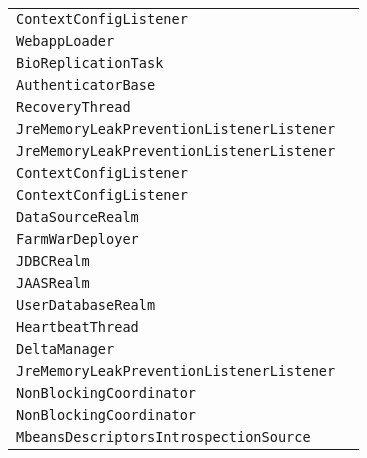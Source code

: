 \begin{center}
\begin{tabular}{ll}
\lstinline/ContextConfigListener/&\raisebox{0pt}{\lstinline/ processAnnotationsFile(File)/}\\ 
\lstinline/WebappLoader/&\raisebox{0pt}{\lstinline/ booleanbuildClassPath(StringBuilder)/}\\ 
\lstinline/BioReplicationTask/&\raisebox{0pt}{\lstinline/ sendAck(byte[])/}\\ 
\lstinline/AuthenticatorBase/&\raisebox{0pt}{\lstinline/ JaspicStategetJaspicState(AuthConfigProvider)/}\\ 
\lstinline/RecoveryThread/&\raisebox{0pt}{\lstinline/ run()/}\\ 
\lstinline/JreMemoryLeakPreventionListenerListener/&\raisebox{0pt}{\lstinline/ lifecycleEvent(LifecycleEvent)/}\\ 
\lstinline/JreMemoryLeakPreventionListenerListener/&\raisebox{0pt}{\lstinline/ lifecycleEvent(LifecycleEvent)/}\\ 
\lstinline/ContextConfigListener/&\raisebox{0pt}{\lstinline/ processAnnotationsFile(File)/}\\ 
\lstinline/ContextConfigListener/&\raisebox{0pt}{\lstinline/ processAnnotationsFile(File)/}\\ 
\lstinline/DataSourceRealm/&\raisebox{0pt}{\lstinline/ getRoles(ConnectiondbConnection,String)/}\\ 
\lstinline/FarmWarDeployer/&\raisebox{0pt}{\lstinline/ booleancopy(File,File)/}\\ 
\lstinline/JDBCRealm/&\raisebox{0pt}{\lstinline/ startInternal())/}\\ 
\lstinline/JAASRealm/&\raisebox{0pt}{\lstinline/ authenticate(String)/}\\ 
\lstinline/UserDatabaseRealm/&\raisebox{0pt}{\lstinline/ startInternal())/}\\ 
\lstinline/HeartbeatThread/&\raisebox{0pt}{\lstinline/ run()/}\\ 
\lstinline/DeltaManager/&\raisebox{0pt}{\lstinline/ messageReceived(SessionMessage,Member)/}\\ 
\lstinline/JreMemoryLeakPreventionListenerListener/&\raisebox{0pt}{\lstinline/ lifecycleEvent(LifecycleEvent)/}\\ 
\lstinline/NonBlockingCoordinator/&\raisebox{0pt}{\lstinline/ fireInterceptorEvent(InterceptorEvent)/}\\ 
\lstinline/NonBlockingCoordinator/&\raisebox{0pt}{\lstinline/ fireInterceptorEvent(InterceptorEvent)/}\\ 
\lstinline/MbeansDescriptorsIntrospectionSource/&\raisebox{0pt}{\lstinline/ createManagedBean(Registry)/}\\ 

\end{tabular}
\end{center}
